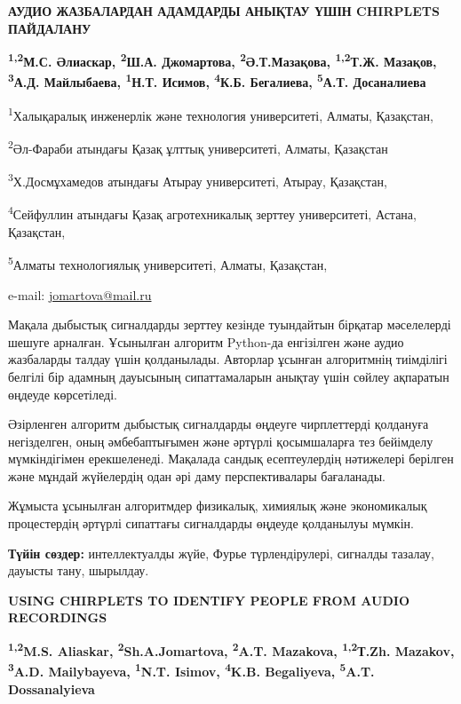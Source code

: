 \begin{articleheader}
{\bfseries АУДИО ЖАЗБАЛАРДАН АДАМДАРДЫ АНЫҚТАУ ҮШІН CHIRPLETS ПАЙДАЛАНУ}

{\bfseries
\textsuperscript{1,2}М.С. Әлиаскар,
\textsuperscript{2}Ш.А. Джомартова\textsuperscript{\envelope },
\textsuperscript{2}Ә.Т.Мазақова,
\textsuperscript{1,2}Т.Ж. Мазақов,
\textsuperscript{3}А.Д. Майлыбаева,
\textsuperscript{1}Н.Т. Исимов,
\textsuperscript{4}К.Б. Бегалиева,
\textsuperscript{5}А.Т. Досаналиева
}
\end{articleheader}

\begin{affiliation}
\textsuperscript{1}Халықаралық инженерлік және технология университеті, Алматы, Қазақстан,

\textsuperscript{2}Әл-Фараби атындағы Қазақ ұлттық университеті, Алматы, Қазақстан

\textsuperscript{3}Х.Досмұхамедов атындағы Атырау университеті, Атырау, Қазақстан,

\textsuperscript{4}Сейфуллин атындағы Қазақ агротехникалық зерттеу университеті, Астана, Қазақстан,

\textsuperscript{5}Алматы технологиялық университеті, Алматы, Қазақстан,

e-mail: \href{mailto:jomartova@mail.ru}{jomartova@mail.ru}
\end{affiliation}

Мақала дыбыстық сигналдарды зерттеу кезінде туындайтын бірқатар
мәселелерді шешуге арналған. Ұсынылған алгоритм Python-да енгізілген
және аудио жазбаларды талдау үшін қолданылады. Авторлар ұсынған
алгоритмнің тиімділігі белгілі бір адамның дауысының сипаттамаларын
анықтау үшін сөйлеу ақпаратын өңдеуде көрсетіледі.

Әзірленген алгоритм дыбыстық сигналдарды өңдеуге чирплеттерді қолдануға
негізделген, оның әмбебаптығымен және әртүрлі қосымшаларға тез бейімделу
мүмкіндігімен ерекшеленеді. Мақалада сандық есептеулердің нәтижелері
берілген және мұндай жүйелердің одан әрі даму перспективалары
бағаланады.

Жұмыста ұсынылған алгоритмдер физикалық, химиялық және экономикалық
процестердің әртүрлі сипаттағы сигналдарды өңдеуде қолданылуы мүмкін.

{\bfseries Түйін сөздер:} интеллектуалды жүйе, Фурье түрлендірулері,
сигналды тазалау, дауысты тану, шырылдау.

\begin{articleheader}
{\bfseries USING CHIRPLETS TO IDENTIFY PEOPLE FROM AUDIO RECORDINGS}

{\bfseries
\textsuperscript{1,2}M.S. Aliaskar,
\textsuperscript{2}Sh.A.Jomartova\textsuperscript{\envelope },
\textsuperscript{2}A.T. Mazakova,
\textsuperscript{1,2}Т.Zh. Mazakov,
\textsuperscript{3}A.D. Mailybayeva,
\textsuperscript{1}N.T. Isimov,
\textsuperscript{4}K.B. Begaliyeva,
\textsuperscript{5}A.T. Dossanalyieva
}
\end{articleheader}

